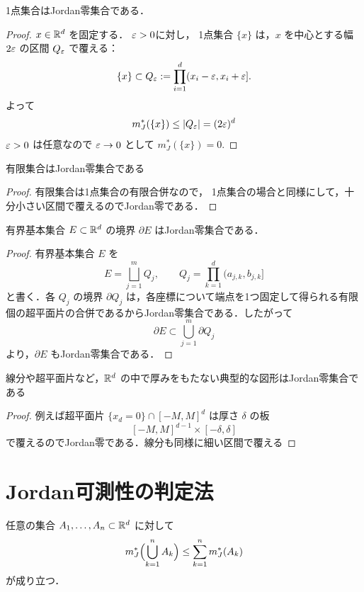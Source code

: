 \begin{example}
    1点集合はJordan零集合である．
\end{example}

\begin{proof}
$x \in \mathbb R^d$ を固定する．
$\varepsilon > 0$に対し，
1点集合 $\{ x \}$ は，$x$ を中心とする幅 $2 \varepsilon$ の区間 $Q_\varepsilon$ で覆える：
\[
\{ x \} \subset Q_\varepsilon := \prod_{i=1}^d (x_i - \varepsilon, x_i+\varepsilon].
\]
よって
\[
m_J^*(\{x\}) \le |Q_\varepsilon| = (2 \varepsilon)^d
\]
$\varepsilon>0$ は任意なので $\varepsilon \to 0$ として $m_J^*(\{x\}) = 0$.

\end{proof}

\begin{example}
    有限集合はJordan零集合である
\end{example}
\begin{proof}
    有限集合は1点集合の有限合併なので，
    1点集合の場合と同様にして，十分小さい区間で覆えるのでJordan零である．
\end{proof}

\begin{example}
    有界基本集合 $E \subset \mathbb R^d$ の境界 $\partial E$ はJordan零集合である．
\end{example}

\begin{proof}有界基本集合 $E$ を
    \[
    E=\bigsqcup_{j=1}^m Q_j,
    \qquad
    Q_j=\prod_{k=1}^d (a_{j,k},b_{j,k}]
    \]
    と書く．各 $Q_j$ の境界 $\partial Q_j$ は，各座標について端点を1つ固定して得られる有限個の超平面片の合併であるからJordan零集合である．したがって
    \[
    \partial E \subset \bigcup_{j=1}^m \partial Q_j
    \]
    より，$\partial E$ もJordan零集合である．
\end{proof}

\begin{example}
    線分や超平面片など，$\mathbb R^d$ の中で厚みをもたない典型的な図形はJordan零集合である
\end{example}
\begin{proof}
    例えば超平面片 $\{x_d=0\} \cap [-M,M]^d$ は厚さ $\delta$ の板
    \[
    [-M,M]^{d-1} \times [-\delta,\delta]
    \]
    で覆えるのでJordan零である．線分も同様に細い区間で覆える
\end{proof}


\section{Jordan可測性の判定法}

\begin{lemma}[Jordan外測度の有限劣加法性]任意の集合 $A_1,\dots,A_n \subset \mathbb R^d$ に対して
    \[
    m_J^*\Bigl(\bigcup_{k=1}^n A_k\Bigr)
    \le \sum_{k=1}^n m_J^*(A_k)
    \]
    が成り立つ．
\end{lemma}

